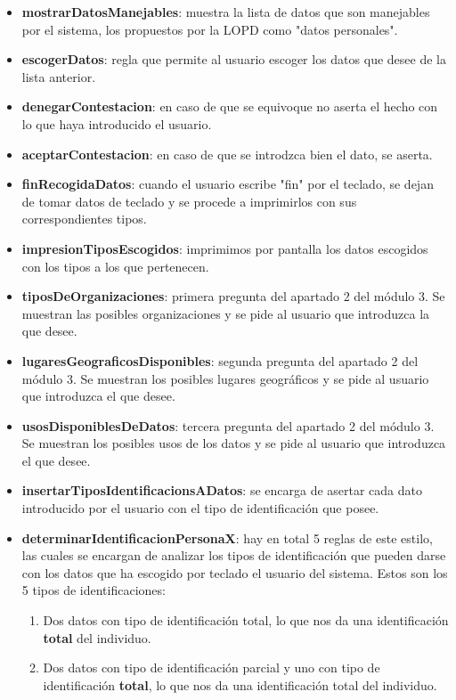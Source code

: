 \begin{itemize}
\begin{itemize}
			\item \textbf{mostrarDatosManejables}: muestra la lista de datos que son manejables por el sistema, los propuestos por la LOPD como "datos personales".
			\item \textbf{escogerDatos}: regla que permite al usuario escoger los datos que desee de la lista anterior.
			\item \textbf{denegarContestacion}: en caso de que se equivoque no aserta el hecho con lo que haya introducido el usuario.
			\item \textbf{aceptarContestacion}: en caso de que se introdzca bien el dato, se aserta.
			\item \textbf{finRecogidaDatos}: cuando el usuario escribe "fin" por el teclado, se dejan de tomar datos de teclado y se procede a imprimirlos con sus correspondientes tipos.
			\item \textbf{impresionTiposEscogidos}: imprimimos por pantalla los datos escogidos con los tipos a los que pertenecen.
			\item \textbf{tiposDeOrganizaciones}: primera pregunta del apartado 2 del módulo 3. Se muestran las posibles organizaciones y se pide al usuario que introduzca la que desee.
			\item \textbf{lugaresGeograficosDisponibles}: segunda pregunta del apartado 2 del módulo 3. Se muestran los posibles lugares geográficos y se pide al usuario que introduzca el que desee.
			\item \textbf{usosDisponiblesDeDatos}: tercera pregunta del apartado 2 del módulo 3. Se muestran los posibles usos de los datos y se pide al usuario que introduzca el que desee.
			\item \textbf{insertarTiposIdentificacionsADatos}: se encarga de asertar cada dato introducido por el usuario con el tipo de identificación que posee.
			\item \textbf{determinarIdentificacionPersonaX}: hay en total 5 reglas de este estilo, las cuales se encargan de analizar los tipos de identificación que pueden darse con los datos que ha escogido por teclado el usuario del sistema. Estos son los 5 tipos de identificaciones:
			\begin{enumerate}
				\item Dos datos con tipo de identificación total, lo que nos da una identificación \textbf{total} del individuo.
				\item Dos datos con tipo de identificación parcial y uno con tipo de identificación \textbf{total}, lo que nos da una identificación total del individuo.

\end{enumerate}
\end{itemize}
\end{itemize}
